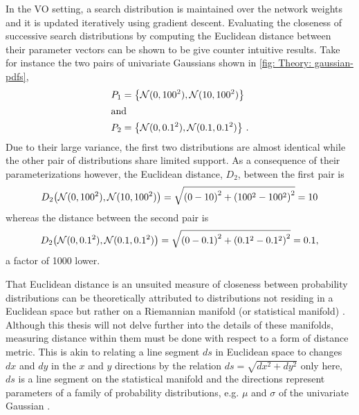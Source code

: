 In the \gls{VO} setting, a search distribution is maintained over the network weights and it is updated iteratively using gradient descent. Evaluating the closeness of successive search distributions by computing the Euclidean distance between their parameter vectors can be shown to be give counter intuitive results. Take for instance the two pairs of univariate Gaussians shown in \autoref{fig: Theory: gaussian-pdfs},
\begin{align*}
    P_1 &= {\left\{\mathcal{N}(0,100^2), \mathcal{N}(10,100^2)\right\}}\\
    \shortintertext{and}
    P_2 &= {\left\{\mathcal{N}(0,0.1^2), \mathcal{N}(0.1,0.1^2)\right\}} \ .
\end{align*}
Due to their large variance, the first two distributions are almost identical while the other pair of distributions share limited support. As a consequence of their parameterizations however, the Euclidean distance, $D_2$, between the first pair is
$$D_\text{2}{\left(\mathcal{N}(0,100^2), \mathcal{N}(10,100^2)\right)} = \sqrt{{\left(0-10\right)}^2+{\left(100^2-100^2\right)}^2}= 10$$
whereas the distance between the second pair is
$$D_\text{2}{\left(\mathcal{N}(0,0.1^2), \mathcal{N}(0.1,0.1^2)\right)} = \sqrt{{\left(0-0.1\right)}^2+{\left(0.1^2-0.1^2\right)}^2}= 0.1,$$
a factor of 1000 lower. 

That Euclidean distance is an unsuited measure of closeness between probability distributions can be theoretically attributed to distributions not residing in a Euclidean space but rather on a Riemannian manifold (or statistical manifold) \cite{Suzuki2014}. Although this thesis will not delve further into the details of these manifolds, measuring distance within them must be done with respect to a form of distance metric. This is akin to relating a line segment $ds$ in Euclidean space to changes $dx$ and $dy$ in the $x$ and $y$ directions by the relation $ds=\sqrt{dx^2+dy^2}$ only here, $ds$ is a line segment on the statistical manifold and the directions represent parameters of a family of probability distributions, e.g. $\mu$ and $\sigma$ of the univariate Gaussian \cite{Suzuki2014}.


